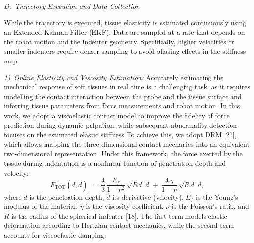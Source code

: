 \documentclass[11pt]{article}
\begin{document}
\vspace{0.6em}

\noindent\textit{D.~Trajectory Execution and Data Collection}

\vspace{0.2em}

\noindent
While the trajectory is executed, tissue elasticity is estimated
continuously using an Extended Kalman Filter (EKF). Data are sampled
at a rate that depends on the robot motion and the indenter geometry.
Specifically, higher velocities or smaller indenters require denser
sampling to avoid aliasing effects in the stiffness map.

\vspace{0.3em}

\noindent\textit{\hspace{1em}1)~Online Elasticity and Viscosity
Estimation:} Accurately estimating the mechanical response of soft
tissues in real time is a challenging task, as it requires modelling
the contact interaction between the probe and the tissue surface and
inferring tissue parameters from force measurements and robot motion.
In this work, we adopt a viscoelastic contact model to improve the
fidelity of force prediction during dynamic palpation, while
subsequent abnormality detection focuses on the estimated elastic
stiffness To achieve this, we adopt DRM [27], which allows mapping
the three-dimensional contact mechanics into an equivalent
two-dimensional representation. Under this framework, the force
exerted by the tissue during indentation is a nonlinear function of
penetration depth and velocity:
\begin{equation}
F_{\mathrm{TOT}}(d,\dot{d})
  \;=\; \frac{4}{3}\,\frac{E_{f}}{1-\nu^{2}}\,\sqrt{R\,d}\;d
     \;+\; \frac{4\,\eta}{1-\nu}\,\sqrt{R\,d}\;\dot{d},
\end{equation}
where $d$ is the penetration depth, $\dot{d}$ its derivative
(velocity), $E_{f}$ is the Young's modulus of the material, $\eta$ is
the viscosity coefficient, $\nu$ is the Poisson's ratio, and $R$ is
the radius of the spherical indenter [18]. The first term models
elastic deformation according to Hertzian contact mechanics, while
the second term accounts for viscoelastic damping.

\vspace{0.3em}
\end{document}
